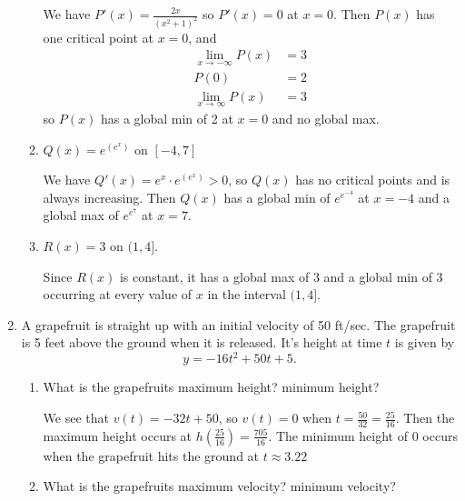 \documentclass[11pt]{article}
\begin{document}
\begin{enumerate}
\begin{enumerate}
{      We have $P'(x) = \frac{2x}{(x^2+1)^2}$ so $P'(x) = 0$ at $x=0$.
      Then $P(x)$ has one critical point at $x=0$, and
      \begin{align*}
        \lim_{x\to -\infty}P(x) &= 3\\
        P(0) &= 2\\
        \lim_{x\to \infty}P(x) &= 3
      \end{align*}
      so $P(x)$ has a global min of 2 at $x=0$ and no global max.

    }
    \vfill

    \newpage

  \item $\displaystyle Q(x)=e^{\left(e^x\right)}$ on $[-4,7]$
    \vfill
    {\color{blue}
      
      We have $Q'(x)=e^x\cdot e^{\left(e^x\right)} > 0$, so $Q(x)$ has
      no critical points and is always increasing.  Then $Q(x)$ has a
      global min of $e^{e^{-4}}$ at $x=-4$ and a global max of
      $e^{e^7}$ at $x=7$.

    }
    \vfill

  \item $R(x)=3$ on $(1,4]$.
    \vfill
    {\color{blue}

      Since $R(x)$ is constant, it has a global max of 3 and a global
      min of 3 occurring at every value of $x$ in the interval
      $(1,4]$.
      
    }
    \vfill 
  \end{enumerate}

\newpage


\item A grapefruit is straight up with an initial velocity of 50
  ft/sec.  The grapefruit is 5 feet above the ground when it is
  released.  It's height at time $t$ is given by
  \[
  y=-16t^2+50t+5.
  \]
  \begin{enumerate}
  \item What is the grapefruits maximum height? minimum height?
    \vfill
    {\color{blue}

      We see that $v(t) = -32t+50$, so $v(t) = 0$ when
      $t=\frac{50}{32}=\frac{25}{16}$. Then the maximum height occurs
      at $h\left(\frac{25}{16}\right) = \frac{705}{16}$.  The minimum
      height of 0 occurs when the grapefruit hits the ground at
      $t\approx 3.22$
      
    }
    \vfill
    
  \item What is the grapefruits maximum velocity? minimum velocity?
    \vfill
    {\color{blue}

}
\end{enumerate}
\end{enumerate}
\end{document}
